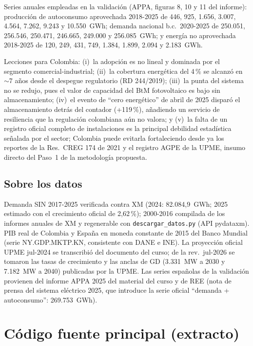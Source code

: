 Series anuales empleadas en la validación (APPA, figuras 8, 10 y 11 del
informe): producción de autoconsumo aprovechada 2018-2025 de 446, 925,
1.656, 3.007, 4.564, 7.262, 9.243 y 10.550~GWh; demanda nacional b.c.\
2020-2025 de 250.051, 256.546, 250.471, 246.665, 249.000 y 256.085~GWh; y
energía no aprovechada 2018-2025 de 120, 249, 431, 749, 1.384, 1.899, 2.094
y 2.183~GWh.

Lecciones para Colombia: (i)~la adopción es no lineal y dominada por el
segmento comercial-industrial; (ii)~la cobertura energética del 4\,\% se
alcanzó en ${\sim}7$ años desde el despegue regulatorio (RD 244/2019);
(iii)~la punta del sistema no se redujo, pues el valor de capacidad del BtM
fotovoltaico es bajo sin almacenamiento; (iv)~el evento de ``cero
energético'' de abril de 2025 disparó el almacenamiento detrás del contador
(+119\,\%), añadiendo un servicio de resiliencia que la regulación colombiana
aún no valora; y (v)~la falta de un registro oficial completo de
instalaciones es la principal debilidad estadística señalada por el sector;
Colombia puede evitarla fortaleciendo desde ya los reportes de la
Res.~CREG 174 de 2021 y el registro AGPE de la UPME, insumo directo del
Paso~1 de la metodología propuesta.

\subsection{Sobre los datos}

Demanda SIN 2017-2025 verificada contra XM (2024: 82.084,9~GWh; 2025
estimado con el crecimiento oficial de 2,62\,\%); 2000-2016 compilada de los
informes anuales de XM y regenerable con \texttt{descargar\_datos.py}
(API pydataxm). PIB real de Colombia y España en moneda constante de 2015
del Banco Mundial (serie NY.GDP.MKTP.KN, consistente con DANE e INE). La
proyección oficial UPME jul-2024 se transcribió del documento del curso; de
la rev.\ jul-2026 se tomaron las tasas de crecimiento y las anclas de GD
(3.331~MW a 2030 y 7.182~MW a 2040) publicadas por la UPME. Las series
españolas de la validación provienen del informe APPA 2025 del material del
curso y de REE (nota de prensa del sistema eléctrico 2025, que introduce la
serie oficial ``demanda + autoconsumo'': 269.753~GWh).

\clearpage
\section{Código fuente principal (extracto)}

